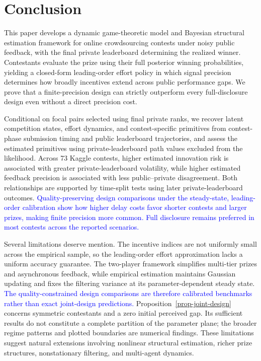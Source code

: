 \documentclass[mnsc]{informs3}
\begin{document}
\section{Conclusion}

This paper develops a dynamic game-theoretic model and Bayesian structural estimation framework for online crowdsourcing contests under noisy public feedback, with the final private leaderboard determining the realized winner. Contestants evaluate the prize using their full posterior winning probabilities, yielding a closed-form leading-order effort policy in which signal precision determines how broadly incentives extend across public performance gaps. We prove that a finite-precision design can strictly outperform every full-disclosure design even without a direct precision cost.

Conditional on focal pairs selected using final private ranks, we recover latent competition states, effort dynamics, and contest-specific primitives from contest-phase submission timing and public leaderboard trajectories, and assess the estimated primitives using private-leaderboard path values excluded from the likelihood. Across 73 Kaggle contests, higher estimated innovation risk is associated with greater private-leaderboard volatility, while higher estimated feedback precision is associated with less public--private disagreement. Both relationships are supported by time-split tests using later private-leaderboard outcomes. \textcolor{blue}{Quality-preserving design comparisons under the steady-state, leading-order calibration show how higher delay costs favor shorter contests and larger prizes, making finite precision more common. Full disclosure remains preferred in most contests across the reported scenarios.}

Several limitations deserve mention. The incentive indices are not uniformly small across the empirical sample, so the leading-order effort approximation lacks a uniform accuracy guarantee. The two-player framework simplifies multi-tier prizes and asynchronous feedback, while empirical estimation maintains Gaussian updating and fixes the filtering variance at its parameter-dependent steady state. \textcolor{blue}{The quality-constrained design comparisons are therefore calibrated benchmarks rather than exact joint-design predictions.} Proposition~\ref{prop-joint-design} concerns symmetric contestants and a zero initial perceived gap. Its sufficient results do not constitute a complete partition of the parameter plane; the broader regime patterns and plotted boundaries are numerical findings. These limitations suggest natural extensions involving nonlinear structural estimation, richer prize structures, nonstationary filtering, and multi-agent dynamics.
\end{document}
